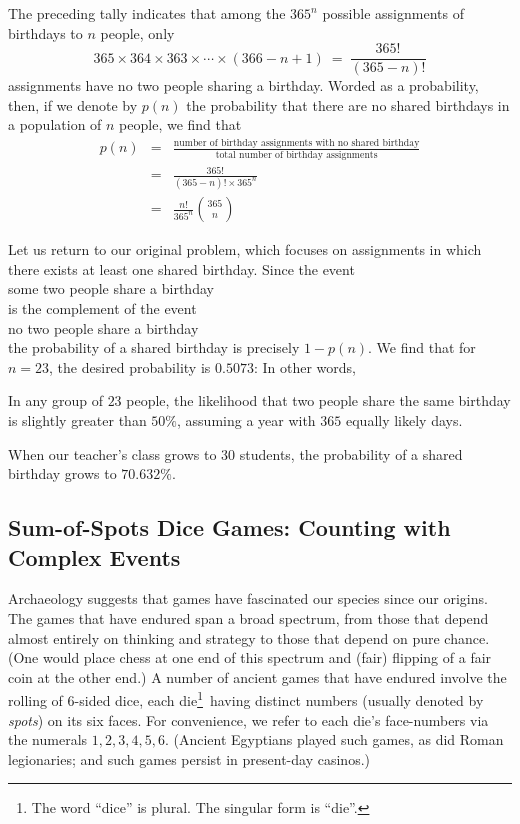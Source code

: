 The preceding tally indicates that among the $365^n$ possible
assignments of birthdays to $n$ people, only
\[ 365 \times 364 \times 363 \times \cdots \times
(366-n+1) \ = \ \frac{365!}{(365-n)!} 
\]
assignments have no two people sharing a birthday.  Worded as a
probability, then, if we denote by $p(n)$ the probability that there are no shared
birthdays in a population of $n$ people, we find that
\begin{eqnarray*}
p(n) & = &
\frac{\mbox{number of birthday assignments with no shared birthday}}
{\mbox{total number of birthday assignments}} \\
 &  = & \frac{365!}{ (365-n)!  \times 365^n} \\
 & = & \frac{n!}{365^n} {365 \choose n}
\end{eqnarray*}

\medskip

Let us return to our original problem, which focuses on assignments in
which there exists at least one shared birthday.  Since the event \\
\hspace*{.25in}some two people share a birthday \\
is the complement of the event \\
\hspace*{.25in}no two people share a birthday \\
the probability of a shared birthday is precisely $1-p(n)$.  We find
that for $n=23$, the desired probability is $0.5073$:  In other words,

\begin{prop}
In any group of $23$ people, the likelihood that two people share the same
birthday is slightly greater than $50\%$, assuming a year with $365$
equally likely days.
\end{prop}

When our teacher's class grows to 30 students, the probability of a shared birthday grows
to $70.632\%$.


\subsection{Sum-of-Spots Dice Games: Counting with Complex Events}
\label{sec:three-dice}

Archaeology suggests that games have fascinated our species since our origins.  The 
games that have endured span a broad spectrum, from those that depend almost entirely 
on thinking and strategy to those that depend on pure chance.  (One would place chess 
at one end of this spectrum and (fair) flipping of a fair coin at the other end.)  A number of 
ancient games that have endured involve the rolling of 6-sided dice, each die\footnote{The 
word ``dice'' is plural.  The singular form is ``die''.}~having distinct numbers (usually denoted
by {\it spots}) on its six faces.  For convenience, we refer to each die's face-numbers via the 
numerals $1, 2, 3, 4, 5, 6$.  (Ancient Egyptians played such games, as did Roman legionaries; 
and such games persist in present-day casinos.)

